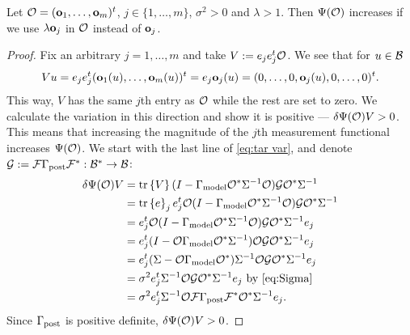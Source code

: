 \documentclass{amsart}
\numberwithin{equation}{section}
\begin{document}
\begin{proposition}\label{prop:bigger better}
  Let $\mathcal{O} = (\mathbf{o}_1,\dots,\mathbf{o}_m)^t$, $j \in \{1,\dots,m\}$, $\sigma^2
  > 0$ and $\lambda > 1$. Then $\Psi(\mathcal{O})$ increases if we use
  $\lambda \mathbf{o}_j$ in $\mathcal{O}$ instead of $\mathbf{o}_j$.
\end{proposition}
\begin{proof} 
  Fix an arbitrary $j=1,\dots,m$ and take $V:= e_j e_j^t \mathcal{O}$. We see
  that for $u \in \mathcal{B}$
  \begin{equation*}
    Vu = e_je_j^t (\mathbf{o}_1(u),\dots,\mathbf{o}_m(u) )^t = e_j \mathbf{o}_j(u)
    = (0,\dots,0,\mathbf{o}_j(u),0,\dots,0)^t.
  \end{equation*}
  This way, $V$ has the same $j$th entry as $\mathcal{O}$ while the rest are
  set to zero. We calculate the variation in this direction and show
  it is positive --- $\delta \Psi(\mathcal{O})V > 0$. This means that
  increasing the magnitude of the $j$th measurement functional
  increases $\Psi(\mathcal{O})$. We start with the last line of \eqref{eq:tar
    var}, and denote $\mathcal{G} : = \mathcal{F} \Gamma_{\textup{post}} \mathcal{F}^*: \mathcal{B}^* \to \mathcal{B}$:
  \begin{align*}
     \delta \Psi(\mathcal{O}) V 
    &= \textup{tr}\left \{V \right \} ( I - \Gamma_{\textup{model}} \mathcal{O}^*\Sigma^{-1}\mathcal{O}) \mathcal{G} \mathcal{O}^* \Sigma^{-1} \\
    &= \textup{tr}\left \{e \right \}_je_j^t \mathcal{O} ( I - \Gamma_{\textup{model}} \mathcal{O}^*\Sigma^{-1}\mathcal{O}) \mathcal{G} \mathcal{O}^* \Sigma^{-1} \\
    &= e_j^t \mathcal{O} ( I - \Gamma_{\textup{model}} \mathcal{O}^*\Sigma^{-1}\mathcal{O}) \mathcal{G} \mathcal{O}^* \Sigma^{-1}e_j \\
    &= e_j^t ( I - \mathcal{O} \Gamma_{\textup{model}} \mathcal{O}^*\Sigma^{-1})\mathcal{O} \mathcal{G} \mathcal{O}^* \Sigma^{-1}e_j \\  
    &=  e_j^t(\Sigma-\mathcal{O} \Gamma_{\textup{model}} \mathcal{O}^*) \Sigma^{-1}\mathcal{O} \mathcal{G} \mathcal{O}^* \Sigma^{-1}e_j \\
    &=\sigma^2 e_j^t \Sigma^{-1}\mathcal{O} \mathcal{G} \mathcal{O}^* \Sigma^{-1}e_j
    \text{ by \eqref{eq:Sigma} }\\
    &=\sigma^2 e_j^t \Sigma^{-1}\mathcal{O} \mathcal{F} \Gamma_{\textup{post}} \mathcal{F}^* \mathcal{O}^* \Sigma^{-1}e_j.
  \end{align*} 
  Since $\Gamma_{\textup{post}}$ is positive definite, $\delta \Psi(\mathcal{O}) V > 0$.
\end{proof}
\end{document}
